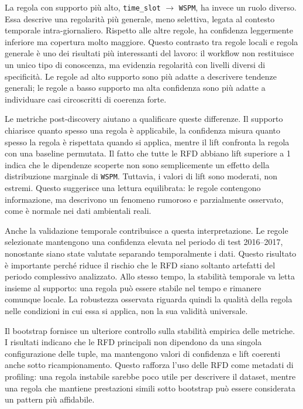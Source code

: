 \documentclass[a4paper,12pt]{article}
\newcommand{\Wspm}{\texttt{WSPM}}
\newcommand{\TimeSlot}{\texttt{time\_slot}}
\begin{document}
La regola con supporto più alto, \TimeSlot{} $\rightarrow$ \Wspm, ha invece un ruolo diverso. Essa descrive una regolarità più generale, meno selettiva, legata al contesto temporale intra-giornaliero. Rispetto alle altre regole, ha confidenza leggermente inferiore ma copertura molto maggiore. Questo contrasto tra regole locali e regola generale è uno dei risultati più interessanti del lavoro: il workflow non restituisce un unico tipo di conoscenza, ma evidenzia regolarità con livelli diversi di specificità. Le regole ad alto supporto sono più adatte a descrivere tendenze generali; le regole a basso supporto ma alta confidenza sono più adatte a individuare casi circoscritti di coerenza forte.

Le metriche post-discovery aiutano a qualificare queste differenze. Il supporto chiarisce quanto spesso una regola è applicabile, la confidenza misura quanto spesso la regola è rispettata quando si applica, mentre il lift confronta la regola con una baseline permutata. Il fatto che tutte le RFD abbiano lift superiore a 1 indica che le dipendenze scoperte non sono semplicemente un effetto della distribuzione marginale di \Wspm. Tuttavia, i valori di lift sono moderati, non estremi. Questo suggerisce una lettura equilibrata: le regole contengono informazione, ma descrivono un fenomeno rumoroso e parzialmente osservato, come è normale nei dati ambientali reali.

Anche la validazione temporale contribuisce a questa interpretazione. Le regole selezionate mantengono una confidenza elevata nel periodo di test 2016--2017, nonostante siano state valutate separando temporalmente i dati. Questo risultato è importante perché riduce il rischio che le RFD siano soltanto artefatti del periodo complessivo analizzato. Allo stesso tempo, la stabilità temporale va letta insieme al supporto: una regola può essere stabile nel tempo e rimanere comunque locale. La robustezza osservata riguarda quindi la qualità della regola nelle condizioni in cui essa si applica, non la sua validità universale.

Il bootstrap fornisce un ulteriore controllo sulla stabilità empirica delle metriche. I risultati indicano che le RFD principali non dipendono da una singola configurazione delle tuple, ma mantengono valori di confidenza e lift coerenti anche sotto ricampionamento. Questo rafforza l'uso delle RFD come metadati di profiling: una regola instabile sarebbe poco utile per descrivere il dataset, mentre una regola che mantiene prestazioni simili sotto bootstrap può essere considerata un pattern più affidabile.
\end{document}

